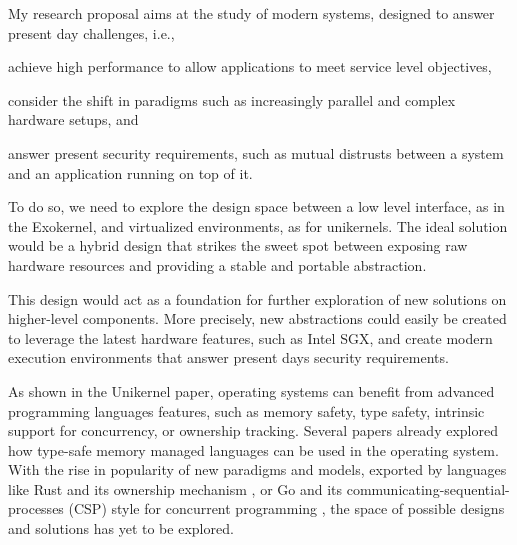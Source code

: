 My research proposal aims at the study of modern systems, designed to answer present day challenges, i.e.,
\begin{enumerate*}
	\item achieve high performance to allow applications to meet service level objectives,
	\item consider the shift in paradigms such as increasingly parallel and complex hardware setups, and
	\item answer present security requirements, such as mutual distrusts between a system and an application running on top of it.
\end{enumerate*}
To do so, we need to explore the design space between a low level interface, as in the Exokernel, and virtualized environments, as for unikernels.
The ideal solution would be a hybrid design that strikes the sweet spot between exposing raw hardware resources and providing a stable and portable abstraction.

This design would act as a foundation for further exploration of new solutions on higher-level components. 
More precisely, new abstractions could easily be created to leverage the latest hardware features, such as Intel SGX, and create modern execution environments that answer present days security requirements.

As shown in the Unikernel paper, operating systems can benefit from advanced programming languages features, such as memory safety, type safety, intrinsic support for concurrency, or ownership tracking.
Several papers \cite{DBLP:conf/asplos/MadhavapeddyMRSSGSHC13,DBLP:conf/sosp/BershadSPSFBCE95,DBLP:journals/sigops/HuntL07} already explored how type-safe memory managed languages can be used in the operating system.
With the rise in popularity of new paradigms and models, exported by languages like Rust and its ownership mechanism \cite{rust}, or Go and its communicating-sequential-processes (CSP) style for concurrent programming \cite{golang}, the space of possible designs and solutions has yet to be explored.